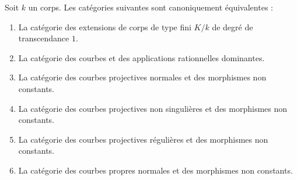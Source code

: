 \begin{theorem}
\label{theorem-curves-rational-maps}
Soit $k$ un corps. Les catégories suivantes sont canoniquement équivalentes : \begin{enumerate} \item La catégorie des extensions de corps de type fini $K/k$ de degré de transcendance $1$. \item La catégorie des courbes et des applications rationnelles dominantes. \item La catégorie des courbes projectives normales et des morphismes non constants. \item La catégorie des courbes projectives non singulières et des morphismes non constants. \item La catégorie des courbes projectives régulières et des morphismes non constants. \item La catégorie des courbes propres normales et des morphismes non constants.
\end{enumerate}
\end{theorem}


